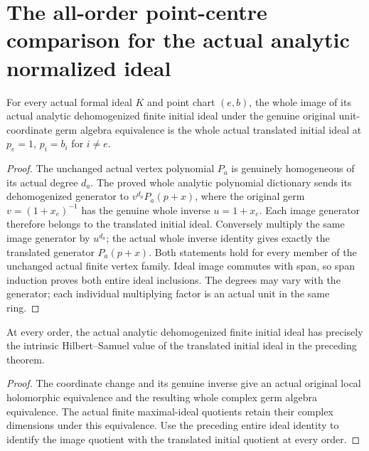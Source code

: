 \section{The all-order point-centre comparison for the actual analytic normalized ideal}

\begin{theorem}
\label{hir:actual-point-unit-map-whole-initial-ideals}
\leanok
For every actual formal ideal $K$ and point chart $(e,b)$, the whole
image of its actual analytic dehomogenized finite initial ideal under the
genuine original unit-coordinate germ algebra equivalence is the whole
actual translated initial ideal at $p_e=1$, $p_i=b_i$ for $i\ne e$.
\end{theorem}
\begin{proof}
The unchanged actual vertex polynomial $P_a$ is genuinely homogeneous of
its actual degree $d_a$. The proved whole analytic polynomial dictionary
sends its dehomogenized generator to $v^{d_a}P_a(p+x)$, where the original
germ $v=(1+x_e)^{-1}$ has the genuine whole inverse $u=1+x_e$.
Each image generator therefore belongs to the translated initial ideal.
Conversely multiply the same image generator by $u^{d_a}$; the actual
whole inverse identity gives exactly the translated generator $P_a(p+x)$.
Both statements hold for every member of the unchanged actual finite
vertex family. Ideal image commutes with span, so span induction proves
both entire ideal inclusions. The degrees may vary with the generator;
each individual multiplying factor is an actual unit in the same ring.
\end{proof}

\begin{theorem}
\label{hir:actual-point-unit-initial-all-hs-equality}
\leanok
At every order, the actual analytic dehomogenized finite initial ideal
has precisely the intrinsic Hilbert--Samuel value of the translated
initial ideal in the preceding theorem.
\end{theorem}
\begin{proof}
The coordinate change and its genuine inverse give an actual original
local holomorphic equivalence and the resulting whole complex germ
algebra equivalence. The actual finite maximal-ideal quotients retain
their complex dimensions under this equivalence. Use the preceding
entire ideal identity to identify the image quotient with the translated
initial quotient at every order.
\end{proof}

